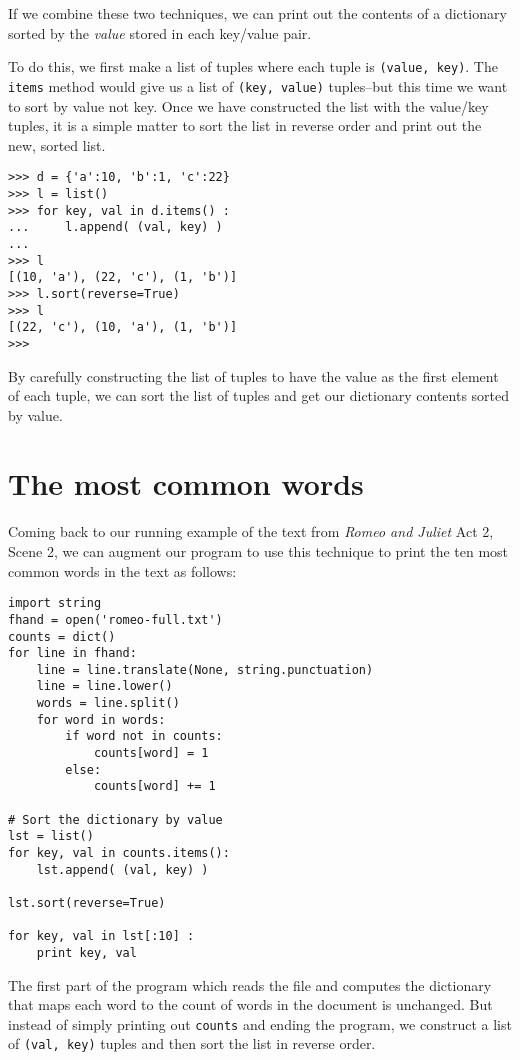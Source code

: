 If we combine these two techniques, we can print out the contents
of a dictionary sorted by the \emph{value} stored in each key/value
pair.

To do this, we first make a list of tuples where each tuple is 
{\tt (value, key)}.  The {\tt items} method would give us a list of 
{\tt (key, value)} tuples--but this time we want to sort by value not key.
Once we have constructed the list with the value/key tuples, it is a simple
matter to sort the list in reverse order and print out the new, sorted list.

\beforeverb
\begin{verbatim}
>>> d = {'a':10, 'b':1, 'c':22}
>>> l = list()
>>> for key, val in d.items() :
...     l.append( (val, key) )
... 
>>> l
[(10, 'a'), (22, 'c'), (1, 'b')]
>>> l.sort(reverse=True)
>>> l
[(22, 'c'), (10, 'a'), (1, 'b')]
>>> 
\end{verbatim}
\afterverb
%
By carefully constructing the list of tuples to have the value as the first
element of each tuple, we can sort the list of tuples and get our dictionary
contents sorted by value.

\section{The most common words}

Coming back to our running example of the text from \emph{Romeo and Juliet} 
Act 2, Scene 2, we can augment our program to use this technique to 
print the ten most common words in the text as follows:

\beforeverb
\begin{verbatim}
import string
fhand = open('romeo-full.txt')
counts = dict()
for line in fhand:
    line = line.translate(None, string.punctuation)
    line = line.lower()
    words = line.split()
    for word in words:
        if word not in counts:
            counts[word] = 1
        else:
            counts[word] += 1

# Sort the dictionary by value
lst = list()
for key, val in counts.items():
    lst.append( (val, key) )

lst.sort(reverse=True)

for key, val in lst[:10] :
    print key, val
\end{verbatim}
\afterverb
%
The first part of the program which reads the file and computes 
the dictionary that maps each word to the count of words in the 
document is unchanged.  But instead of simply printing out 
{\tt counts} and ending the program, we construct a list 
of {\tt (val, key)} tuples and then sort the list in reverse order.

